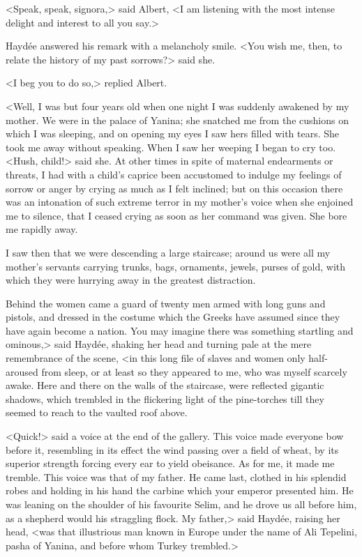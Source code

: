 <Speak, speak, signora,> said Albert, <I am listening with the most intense delight and interest to all you say.> 

 Haydée answered his remark with a melancholy smile. <You wish me, then, to relate the history of my past sorrows?> said she. 

 <I beg you to do so,> replied Albert. 

 <Well, I was but four years old when one night I was suddenly awakened by my mother. We were in the palace of Yanina; she snatched me from the cushions on which I was sleeping, and on opening my eyes I saw hers filled with tears. She took me away without speaking. When I saw her weeping I began to cry too. <Hush, child!> said she. At other times in spite of maternal endearments or threats, I had with a child's caprice been accustomed to indulge my feelings of sorrow or anger by crying as much as I felt inclined; but on this occasion there was an intonation of such extreme terror in my mother's voice when she enjoined me to silence, that I ceased crying as soon as her command was given. She bore me rapidly away. 

I saw then that we were descending a large staircase; around us were all my mother's servants carrying trunks, bags, ornaments, jewels, purses of gold, with which they were hurrying away in the greatest distraction. 

Behind the women came a guard of twenty men armed with long guns and pistols, and dressed in the costume which the Greeks have assumed since they have again become a nation. You may imagine there was something startling and ominous,> said Haydée, shaking her head and turning pale at the mere remembrance of the scene, <in this long file of slaves and women only half-aroused from sleep, or at least so they appeared to me, who was myself scarcely awake. Here and there on the walls of the staircase, were reflected gigantic shadows, which trembled in the flickering light of the pine-torches till they seemed to reach to the vaulted roof above. 

<Quick!> said a voice at the end of the gallery. This voice made everyone bow before it, resembling in its effect the wind passing over a field of wheat, by its superior strength forcing every ear to yield obeisance. As for me, it made me tremble. This voice was that of my father. He came last, clothed in his splendid robes and holding in his hand the carbine which your emperor presented him. He was leaning on the shoulder of his favourite Selim, and he drove us all before him, as a shepherd would his straggling flock. My father,> said Haydée, raising her head, <was that illustrious man known in Europe under the name of Ali Tepelini, pasha of Yanina, and before whom Turkey trembled.> 

